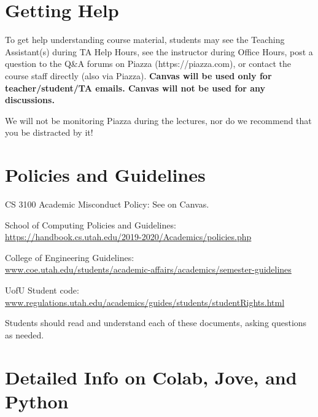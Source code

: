 \documentclass[12pt]{article}
\newcommand{\denselist}{\vspace{-5pt} \itemsep -2pt\parsep=-1pt\partopsep -2pt}
\begin{document}
\section{Getting Help}

To get help understanding course material, students may see the Teaching Assistant(s) during TA Help Hours, see the instructor during Office Hours, post a question to the Q\&A forums on Piazza (https://piazza.com), or contact the course staff directly (also via Piazza).
%
{\bf Canvas will be used only for teacher/student/TA emails. Canvas
  will not be used for any discussions.}


We will not be monitoring Piazza during the lectures, nor do we recommend
that you be distracted by it!


\section{Policies and Guidelines}

\begin{compactitem}\denselist
\item CS 3100 Academic Misconduct Policy: See on Canvas.

\item School of Computing Policies and Guidelines: \\
  \small{\url{https://handbook.cs.utah.edu/2019-2020/Academics/policies.php}}
  
\item College of Engineering Guidelines:\\
  \small{\url{www.coe.utah.edu/students/academic-affairs/academics/semester-guidelines}}
  
\item UofU Student code:\\
  \small{\url{www.regulations.utah.edu/academics/guides/students/studentRights.html}}
  
\end{compactitem}
Students should read and understand each of these documents, asking questions as needed.




\section{Detailed Info on Colab, Jove, and Python}
\label{sec:detailed-info}
\end{document}

